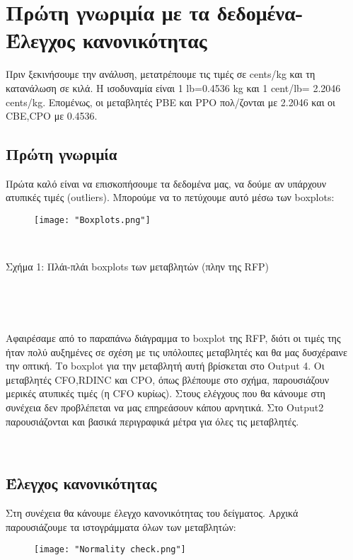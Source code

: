 \documentclass[10pt]{article}
\begin{document}
\section{Πρώτη γνωριμία με τα δεδομένα- Έλεγχος κανονικότητας}

 Πριν ξεκινήσουμε την ανάλυση, μετατρέπουμε τις τιμές σε cents/kg και τη κατανάλωση σε κιλά. Η ισοδυναμία είναι 1 lb=0.4536 kg και 1 cent/lb= 2.2046 cents/kg. Επομένως, οι μεταβλητές PBE και PPO πολ/ζονται με 2.2046 και οι CBE,CPO με 0.4536.
  
\subsection{ Πρώτη γνωριμία}

 Πρώτα καλό είναι να επισκοπήσουμε τα δεδομένα μας, να δούμε αν υπάρχουν ατυπικές τιμές (outliers). Μπορούμε να το πετύχουμε αυτό μέσω των boxplots:
 
 
 \begin{figure}[H]
    \centering
    \texttt{[image: "Boxplots.png"]}
    
    \label{fig:galaxy}
\end{figure}
\

\renewcommand{\caption}{Σχήμα 1: }
\caption{Πλάι-πλάι boxplots των μεταβλητών (πλην της RFP)}


\


\

Αφαιρέσαμε από το παραπάνω διάγραμμα το boxplot της RFP, διότι οι τιμές της ήταν πολύ αυξημένες σε σχέση με τις υπόλοιπες μεταβλητές και θα μας δυσχέραινε την οπτική. Το boxplot για την μεταβλητή αυτή βρίσκεται στο Output 4.
Οι μεταβλητές CFO,RDINC και CPO, όπως βλέπουμε στο σχήμα, παρουσιάζουν μερικές ατυπικές τιμές (η CFΟ κυρίως). Στους ελέγχους που θα κάνουμε στη συνέχεια δεν προβλέπεται να μας επηρεάσουν κάπου αρνητικά.
Στο Οutput2 παρουσιάζονται και βασικά περιγραφικά μέτρα για όλες τις μεταβλητές.
\


\


\subsection{Έλεγχος κανονικότητας}
Στη συνέχεια θα κάνουμε έλεγχο κανονικότητας του δείγματος. Αρχικά παρουσιάζουμε τα ιστογράμματα όλων των μεταβλητών:

\begin{figure}[H]
    \centering
    \texttt{[image: "Normality check.png"]}
    
    \label{fig:galaxy}
\end{figure}
\end{document}
